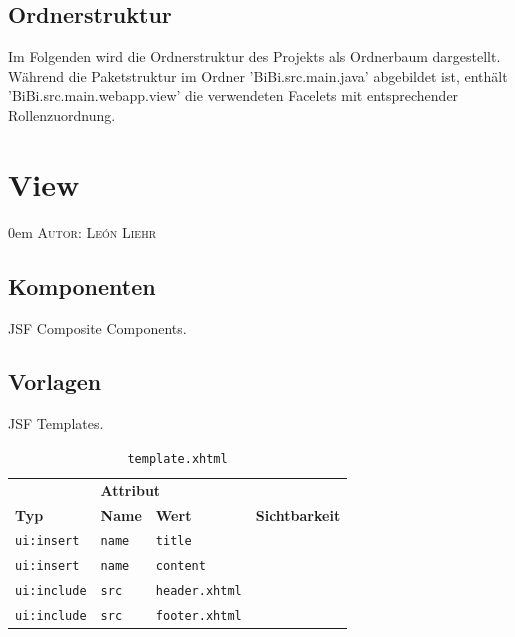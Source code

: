 \documentclass{article}
\makeatletter
\newcommand{\sectionauthor}[1]{
	{\parindent 0em \large \scshape Autor: #1 \par \nobreak \vspace*{1em}}
	\@afterheading
}
\makeatother
\begin{document}
\subsection{Ordnerstruktur}
Im Folgenden wird die Ordnerstruktur des Projekts als Ordnerbaum dargestellt.
Während die Paketstruktur im Ordner 'BiBi.src.main.java' abgebildet ist, enthält 'BiBi.src.main.webapp.view' die verwendeten Facelets mit entsprechender Rollenzuordnung.










\section{View}
\sectionauthor{León Liehr}

\newcommand{\M}[1]{\texttt{#1}}
\newcommand{\tag}[2]{\M{#1:#2}}

\subsection{Komponenten}

JSF Composite Components.

\subsection{Vorlagen}

JSF Templates.

\begin{table}[H]
    \centering
    \begin{tabular}{ l l l l }
        \toprule
        & \multicolumn{2}{l}{\textbf{Attribut}} &\\
        \cmidrule(r){2-3}
        \textbf{Typ} & \textbf{Name} & \textbf{Wert} & \textbf{Sichtbarkeit}\\
        \midrule
        \tag{ui}{insert} & \M{name} & \M{title} & \\
        \tag{ui}{insert} & \M{name} & \M{content} & \\
        \tag{ui}{include} & \M{src} & \M{header.xhtml} & \\
        \tag{ui}{include} & \M{src} & \M{footer.xhtml} & \\
        \bottomrule
    \end{tabular}
    \caption{\M{template.xhtml}}
\end{table}
\end{document}
